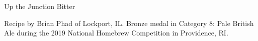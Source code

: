 \begin{recipe}{Up the Junction Bitter} %

\begin{aboutblock}
Recipe by Brian Phad of Lockport, IL. Bronze medal in Category 8: Pale British Ale
during the 2019 National Homebrew Competition in Providence, RI. \sourceaha
\end{aboutblock}


\begin{methodandtiming}
 
\begin{mashsteps}
\end{mashsteps}

\begin{fermentationsteps}
\end{fermentationsteps}

\end{methodandtiming}

\recipebreak

\begin{ingredientsblock}

\begin{malts}
\end{malts}

\begin{hops}
\end{hops}


\end{ingredientsblock}

\end{recipe}
